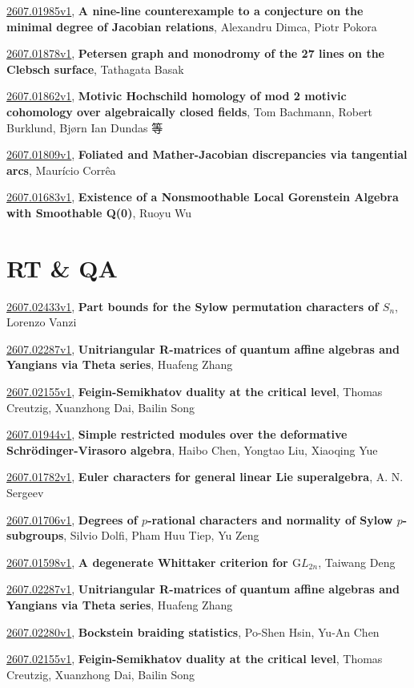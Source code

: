 \documentclass[9pt, a4paper]{article}
\theoremstyle{plain}
\theoremstyle{definition}
\theoremstyle{remark}
\newcommand{\arxiv}[3]{\href{https://arxiv.org/abs/#1}{#1}, \textbf{\textcolor{arxivblue}{#2}}, #3}
\begin{document}
\arxiv{2607.01985v1}{A nine-line counterexample to a conjecture on the minimal degree of Jacobian relations}{Alexandru Dimca, Piotr Pokora}

\arxiv{2607.01878v1}{Petersen graph and monodromy of the 27 lines on the Clebsch surface}{Tathagata Basak}

\arxiv{2607.01862v1}{Motivic Hochschild homology of mod 2 motivic cohomology over algebraically closed fields}{Tom Bachmann, Robert Burklund, Bjørn Ian Dundas 等}

\arxiv{2607.01809v1}{Foliated and Mather-Jacobian discrepancies via tangential arcs}{Maurício Corrêa}

\arxiv{2607.01683v1}{Existence of a Nonsmoothable Local Gorenstein Algebra with Smoothable Q(0)}{Ruoyu Wu}


\section{RT \& QA}
\arxiv{2607.02433v1}{Part bounds for the Sylow permutation characters of $S_n$}{Lorenzo Vanzi}

\arxiv{2607.02287v1}{Unitriangular R-matrices of quantum affine algebras and Yangians via Theta series}{Huafeng Zhang}

\arxiv{2607.02155v1}{Feigin-Semikhatov duality at the critical level}{Thomas Creutzig, Xuanzhong Dai, Bailin Song}

\arxiv{2607.01944v1}{Simple restricted modules over the deformative Schrödinger-Virasoro algebra}{Haibo Chen, Yongtao Liu, Xiaoqing Yue}

\arxiv{2607.01782v1}{Euler characters for general linear Lie superalgebra}{A. N. Sergeev}

\arxiv{2607.01706v1}{Degrees of $p$-rational characters and normality of Sylow $p$-subgroups}{Silvio Dolfi, Pham Huu Tiep, Yu Zeng}

\arxiv{2607.01598v1}{A degenerate Whittaker criterion for $\mathrm GL_{2n}$}{Taiwang Deng}

\arxiv{2607.02287v1}{Unitriangular R-matrices of quantum affine algebras and Yangians via Theta series}{Huafeng Zhang}

\arxiv{2607.02280v1}{Bockstein braiding statistics}{Po-Shen Hsin, Yu-An Chen}

\arxiv{2607.02155v1}{Feigin-Semikhatov duality at the critical level}{Thomas Creutzig, Xuanzhong Dai, Bailin Song}

\end{document}
